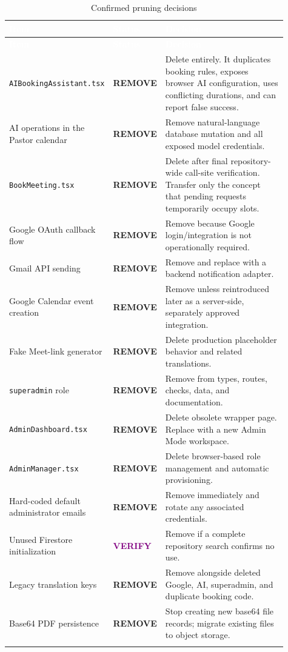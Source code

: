 \documentclass[11pt,a4paper,oneside]{report}
\newcommand{\statusremove}{\textcolor{warnred}{\textbf{REMOVE}}}
\newcommand{\statusverify}{\textcolor{purple}{\textbf{VERIFY}}}
\begin{document}
\begin{longtable}{@{}p{0.30\linewidth} p{0.14\linewidth} p{0.47\linewidth}@{}}
\toprule
\rowcolor{primary}
\textcolor{white}{\textbf{Item}} & \textcolor{white}{\textbf{Status}} & \textcolor{white}{\textbf{Decision}} \\
\midrule
\endfirsthead
\toprule
\rowcolor{primary}
\textcolor{white}{\textbf{Item}} & \textcolor{white}{\textbf{Status}} & \textcolor{white}{\textbf{Decision}} \\
\midrule
\endhead
\texttt{AIBookingAssistant.tsx} & \statusremove & Delete entirely. It duplicates booking rules, exposes browser AI configuration, uses conflicting durations, and can report false success. \\
AI operations in the Pastor calendar & \statusremove & Remove natural-language database mutation and all exposed model credentials. \\
\texttt{BookMeeting.tsx} & \statusremove & Delete after final repository-wide call-site verification. Transfer only the concept that pending requests temporarily occupy slots. \\
Google OAuth callback flow & \statusremove & Remove because Google login/integration is not operationally required. \\
Gmail API sending & \statusremove & Remove and replace with a backend notification adapter. \\
Google Calendar event creation & \statusremove & Remove unless reintroduced later as a server-side, separately approved integration. \\
Fake Meet-link generator & \statusremove & Delete production placeholder behavior and related translations. \\
\texttt{superadmin} role & \statusremove & Remove from types, routes, checks, data, and documentation. \\
\texttt{AdminDashboard.tsx} & \statusremove & Delete obsolete wrapper page. Replace with a new Admin Mode workspace. \\
\texttt{AdminManager.tsx} & \statusremove & Delete browser-based role management and automatic provisioning. \\
Hard-coded default administrator emails & \statusremove & Remove immediately and rotate any associated credentials. \\
Unused Firestore initialization & \statusverify & Remove if a complete repository search confirms no use. \\
Legacy translation keys & \statusremove & Remove alongside deleted Google, AI, superadmin, and duplicate booking code. \\
Base64 PDF persistence & \statusremove & Stop creating new base64 file records; migrate existing files to object storage. \\
\bottomrule
\caption{Confirmed pruning decisions}
\end{longtable}
\end{document}
